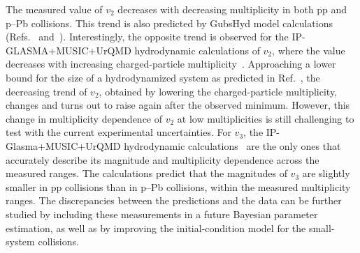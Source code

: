 The measured value of $v_{2}$ decreases with decreasing multiplicity in both pp and p--Pb collisions. This trend is also predicted by GubsHyd model calculations (Refs.~\cite{Taghavi:2019mqz} and~\cite{Weller:2017tsr}). Interestingly, the opposite trend is observed for the IP-GLASMA+MUSIC+UrQMD hydrodynamic calculations of $v_2$, where the value decreases with increasing charged-particle multiplicity~\cite{Schenke:2020mbo}.
Approaching a lower bound for the size of a hydrodynamized
system as predicted in Ref.~\cite{Taghavi:2019mqz}, 
the decreasing trend of $v_2$, obtained by lowering the charged-particle multiplicity, changes and turns out to raise again after the observed minimum. However, this change in multiplicity dependence of $v_2$ at low multiplicities is still challenging to test with the current experimental uncertainties. For $v_3$, the IP-Glasma+MUSIC+UrQMD hydrodynamic calculations~\cite{Schenke:2020mbo} are the only ones that accurately describe its magnitude and multiplicity dependence across the measured ranges. The calculations predict that the magnitudes of $v_3$ are slightly smaller in pp collisions than in p--Pb collisions, within the measured multiplicity ranges. The discrepancies between the predictions and the data can be further studied by including these measurements in a future Bayesian parameter estimation, as well as by improving the initial-condition model for the small-system collisions.

